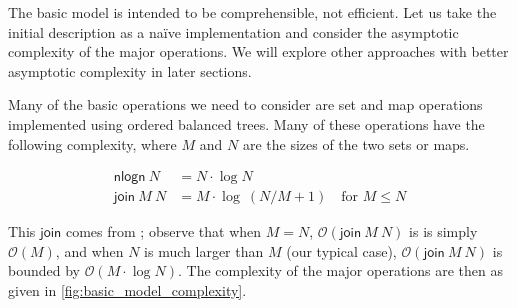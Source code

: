 \documentclass{article}
\newcommand{\order}[1]{\mathcal{O}\left(#1\right)}
\theoremstyle{definition}{
  \newtheorem{lemma}{Lemma}[section] %
  \newtheorem{definition}[lemma]{Definition}
}
\theoremstyle{theorem}{
  \newtheorem{invariant}[lemma]{Invariant}
  \newtheorem{proofobligation}[lemma]{Proof Obligation}
}
\numberwithin{equation}{lemma}
\begin{document}
The basic model is intended to be comprehensible, not efficient. Let us take the
initial description as a na\"ive implementation and consider the asymptotic
complexity of the major operations. We will explore other approaches with
better asymptotic complexity in later sections.

Many of the basic operations we need to consider are set and map operations
implemented using ordered balanced trees. Many of these operations have the
following complexity, where $M$ and $N$ are the sizes of the two sets or maps.

\begin{equation*}
\begin{split}
\mathsf{nlogn} ~ N & = N \cdot \log N \\
\mathsf{join} ~ M ~ N & = M \cdot \log ~ (N/M + 1) \quad \text{for } M \leq N
\end{split}
\end{equation*}

This $\mathsf{join}$ comes from \cite{join_bound}; observe that when $M = N$,
$\order{\mathsf{join} ~ M ~ N}$ is is simply $\order{M}$, and when $N$ is much
larger than $M$ (our typical case), $\order{\mathsf{join} ~ M ~ N}$ is bounded
by $\order{M \cdot \log N}$. The complexity of the major operations are then as
given in \cref{fig:basic_model_complexity}.
\end{document}
